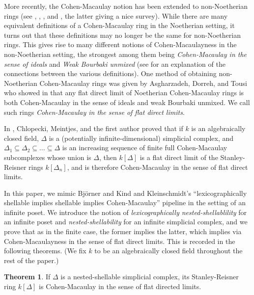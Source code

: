 \documentclass[oneside,11pt,reqno]{amsart}
\theoremstyle{definition}
\newtheorem{proof techniques}{Proof Techniques}
\newtheorem{lettertheorem}{Theorem}
\begin{document}
More recently, the Cohen-Macaulay notion has been extended to non-Noetherian rings (see \cite{glaz1992coherence}, \cite{glaz1995homological}, \cite{hamilton2007non}, and \cite{asgharzadeh2009notion}, the latter giving a nice survey). While there are many equivalent definitions of a Cohen-Macaulay ring in the Noetherian setting, it turns out that these definitions may no longer be the same for non-Noetherian rings. This gives rise to many different notions of Cohen-Macaulayness in the non-Noetherian setting, the strongest among them being \emph{Cohen-Macaulay in the sense of ideals} and \emph{Weak Bourbaki unmixed} (see \cite{asgharzadeh2009notion} for an explanation of the connections between the various definitions). One method of obtaining non-Noetherian Cohen-Macaulay rings was given by Asgharzadeh, Dorreh, and Tousi who showed in \cite[Corollary 3.8]{asgharzadeh2014direct} that any flat direct limit of Noetherian Cohen-Macaulay rings is both Cohen-Macaulay in the sense of ideals and weak Bourbaki unmixed. We call such rings \emph{Cohen-Macaulay in the sense of flat direct limits}.

In \cite{chlopecki2026antidiagonal}, Chlopecki, Meintjes, and the first author proved that if $k$ is an algebraically closed field, $\Delta$ is a (potentially infinite-dimensional) simplicial complex, and $\Delta_1 \subseteq \Delta_2 \subseteq \ldots \subseteq \Delta$ is an increasing sequence of finite full Cohen-Macaulay subcomplexes whose union is $\Delta$, then $k[\Delta]$ is a flat direct limit of the Stanley-Reisner rings $k[\Delta_n]$, and is therefore Cohen-Macaulay in the sense of flat direct limits. 

In this paper, we mimic Bj\"{o}rner and Kind and Kleinschmidt's  ``lexicographically shellable implies shellable implies Cohen-Macaulay'' pipeline in the setting of an infinite poset. We introduce the notion of \emph{lexicographically nested-shellablility} for an infinite poset and \emph{nested-shellability} for an infinite simplicial complex, and we prove that as in the finite case, the former implies the latter, which implies via \cite[Theorem A]{chlopecki2026antidiagonal} Cohen-Macaulayness in the sense of flat direct limits. This is recorded in the following theorems. (We fix $k$ to be an algebraically closed field throughout the rest of the paper.)   

\begin{lettertheorem}\label{thm: main thm nested implies CM}
   If $\Delta$ is a nested-shellable simplicial complex, its Stanley-Reisner ring $k[\Delta]$ is Cohen-Macaulay in the sense of flat directed limits. 
\end{lettertheorem}
\end{document}
